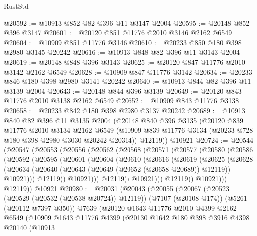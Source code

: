 \begin{lexlean}{RustStd}
\begin{coremodule}
@20592 := @10913 @852 @82 @396 @11 @3147 @2004
@20595 := @20148 @852 @396 @3147
@20601 := @20120 @851 @11776 @2010 @3146 @2162 @6549
@20604 := @10909 @851 @11776 @3146
@20610 := @20233 @850 @180 @398 @2980 @3145 @20242
@20616 := @10913 @848 @82 @396 @11 @3143 @2004
@20619 := @20148 @848 @396 @3143
@20625 := @20120 @847 @11776 @2010 @3142 @2162 @6549
@20628 := @10909 @847 @11776 @3142
@20634 := @20233 @846 @180 @398 @2980 @3141 @20242
@20640 := @10913 @844 @82 @396 @11 @3139 @2004
@20643 := @20148 @844 @396 @3139
@20649 := @20120 @843 @11776 @2010 @3138 @2162 @6549
@20652 := @10909 @843 @11776 @3138
@20658 := @20233 @842 @180 @398 @2980 @3137 @20242
@20689 := @10913
    @840
    @82
    @396
    @11
    @3135
    @2004
    (@20148
      @840
      @396
      @3135
      (@20120
        @839
        @11776
        @2010
        @3134
        @2162
        @6549
        (@10909 @839 @11776 @3134 (@20233 @728 @180 @398 @2980 @3030 @20242 @20314))
        @12119))
    @10921
@20724 := @20544
    (@20547
      (@20553
        (@20556
          (@20562
            (@20568
              (@20571
                (@20577
                  (@20580
                    (@20586
                      (@20592
                        (@20595
                          (@20601
                            (@20604
                              (@20610
                                (@20616
                                  (@20619
                                    (@20625
                                      (@20628
                                        (@20634
                                          (@20640
                                            (@20643 (@20649 (@20652 (@20658 @20689)) @12119))
                                            @10921)))
                                      @12119))
                                  @10921)))
                            @12119))
                        @10921)))
                  @12119))
              @10921)))
        @12119))
    @10921
@20980 := @20031
    (@20043
      (@20055
        (@20067
          (@20523 (@20529 (@20532 (@20538 @20724)) @12119))
          (@7107 (@20108 @174))
          (@5261 (@20112 @7397 @350))
          @7639
          (@20120
            @1643
            @11776
            @2010
            @4399
            @2162
            @6549
            (@10909
              @1643
              @11776
              @4399
              (@20130
                @1642
                @180
                @398
                @3916
                @4398
                @20140
                (@10913

\end{coremodule}
\end{lexlean}
